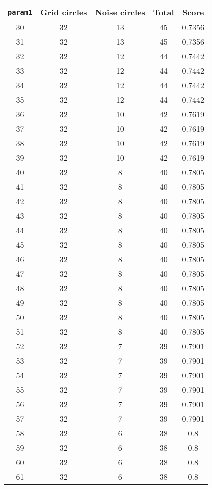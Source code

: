 \documentclass[letterpaper, 12pt]{article}
\begin{document}
\begin{longtable}{|c|c|c|c|c|}
\hline
\textbf{\texttt{param1}} & \textbf{Grid circles} & \textbf{Noise circles} & \textbf{Total} & \textbf{Score} \\
\hline
30 & 32 & 13 & 45 & 0.7356 \\
\hline
31 & 32 & 13 & 45 & 0.7356 \\
\hline
32 & 32 & 12 & 44 & 0.7442 \\
\hline
33 & 32 & 12 & 44 & 0.7442 \\
\hline
34 & 32 & 12 & 44 & 0.7442 \\
\hline
35 & 32 & 12 & 44 & 0.7442 \\
\hline
36 & 32 & 10 & 42 & 0.7619 \\
\hline
37 & 32 & 10 & 42 & 0.7619 \\
\hline
38 & 32 & 10 & 42 & 0.7619 \\
\hline
39 & 32 & 10 & 42 & 0.7619 \\
\hline
40 & 32 & 8 & 40 & 0.7805 \\
\hline
41 & 32 & 8 & 40 & 0.7805 \\
\hline
42 & 32 & 8 & 40 & 0.7805 \\
\hline
43 & 32 & 8 & 40 & 0.7805 \\
\hline
44 & 32 & 8 & 40 & 0.7805 \\
\hline
45 & 32 & 8 & 40 & 0.7805 \\
\hline
46 & 32 & 8 & 40 & 0.7805 \\
\hline
47 & 32 & 8 & 40 & 0.7805 \\
\hline
48 & 32 & 8 & 40 & 0.7805 \\
\hline
49 & 32 & 8 & 40 & 0.7805 \\
\hline
50 & 32 & 8 & 40 & 0.7805 \\
\hline
51 & 32 & 8 & 40 & 0.7805 \\
\hline
52 & 32 & 7 & 39 & 0.7901 \\
\hline
53 & 32 & 7 & 39 & 0.7901 \\
\hline
54 & 32 & 7 & 39 & 0.7901 \\
\hline
55 & 32 & 7 & 39 & 0.7901 \\
\hline
56 & 32 & 7 & 39 & 0.7901 \\
\hline
57 & 32 & 7 & 39 & 0.7901 \\
\hline
58 & 32 & 6 & 38 & 0.8 \\
\hline
59 & 32 & 6 & 38 & 0.8 \\
\hline
60 & 32 & 6 & 38 & 0.8 \\
\hline
61 & 32 & 6 & 38 & 0.8 \\

\end{longtable}
\end{document}
